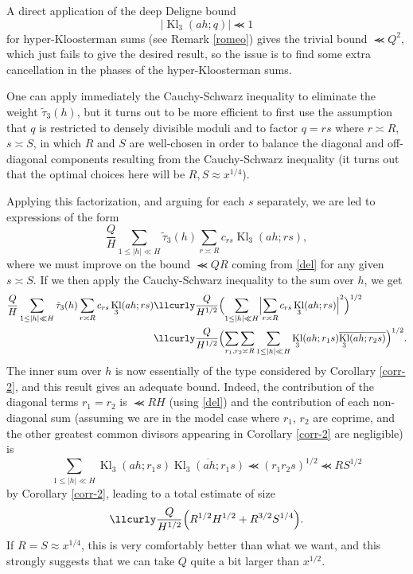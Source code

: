 \documentclass[12pt,a4paper,reqno]{amsart}
\numberwithin{equation}{section}
\DeclareMathOperator{\hypk}{Kl}
\theoremstyle{plain}
\theoremstyle{definition}
\newcommand\sumsum{\mathop{\sum\sum}\limits}
\renewcommand{\sim}{\asymp}
\renewcommand{\lessapprox}{\llcurly}
\begin{document}
A direct application of the deep Deligne bound
\begin{equation}\label{del}
  |\hypk_3(ah;q)|\lessapprox 1
\end{equation}
for hyper-Kloosterman sums (see Remark \ref{romeo}) gives the trivial
bound $\lessapprox Q^2$, which just fails to give the desired result,
so the issue is to find some extra cancellation in the phases of the
hyper-Kloosterman sums. 
\par
One can apply immediately the Cauchy-Schwarz inequality to eliminate
the weight $\tilde\tau_3(h)$, but it turns out to be more efficient to
first use the assumption that $q$ is restricted to densely divisible
moduli and to factor $q=rs$ where $r\sim R$, $s\sim S$, in which $R$ and
$S$ are well-chosen in order to balance the diagonal and off-diagonal
components resulting from the Cauchy-Schwarz inequality (it turns out
that the optimal choices here will be $R,S \approx x^{1/4}$).  
\par
Applying this factorization, and arguing for each $s$ separately, we
are led to expressions of the form
$$ 
\frac{Q}{H}
\sum_{1\leq |h|\ll H} \tilde \tau_3(h) \sum_{r \sim R} c_{rs}
\hypk_3(ah;rs),
$$
where we must improve on the bound $\lessapprox QR$ coming from \eqref{del}
for any given $s \sim S$.  If we then apply the Cauchy-Schwarz
inequality to the sum over $h$, we get
\begin{align*}
  \frac{Q}{H} \sum_{1\leq |h|\ll H} \tilde \tau_3(h) \sum_{r \sim R}
  c_{rs} \hypk_3(ah;rs) &\lessapprox \frac{Q}{H^{1/2}} \Bigl(\sum_{1\leq |h|\ll
    H} \Bigl|\sum_{r \sim R} c_{rs}
  \hypk_3(ah;rs)\Bigr|^2\Bigr)^{1/2}\\
  &\lessapprox \frac{Q}{H^{1/2}}\Bigl(\sumsum_{r_1,r_2 \sim R} \sum_{1\leq
    |h|\ll H} \hypk_3(ah;r_1s)
  \overline{\hypk_3(ah;r_2s)}\Bigr)^{1/2}.
\end{align*}
The inner sum over $h$ is now essentially of the type considered by
Corollary \ref{corr-2}, and this result gives an adequate bound.
Indeed, the contribution of the diagonal terms $r_1=r_2$ is
$\lessapprox R H$ (using \eqref{del}) and the contribution of each
non-diagonal sum (assuming we are in the model case where $r_1$, $r_2$ are coprime, and the other greatest common divisors appearing in Corollary \ref{corr-2} are negligible) is
$$
\sum_{1\leq |h|\ll H} \hypk_3(ah;r_1s) \overline{\hypk_3(ah;r_1s)}
\lessapprox (r_1r_2s)^{1/2}\lessapprox RS^{1/2}
$$ 
by Corollary \ref{corr-2}, leading to a total estimate of size
$$
\lessapprox \frac{Q}{H^{1/2}}\Bigl( R^{1/2}H^{1/2}+R^{3/2} S^{1/4}\Bigr).
$$
If $R=S\approx x^{1/4}$, this is very comfortably better than what we
want, and this strongly suggests that we can take $Q$ quite a bit
larger than $x^{1/2}$.
\end{document}
